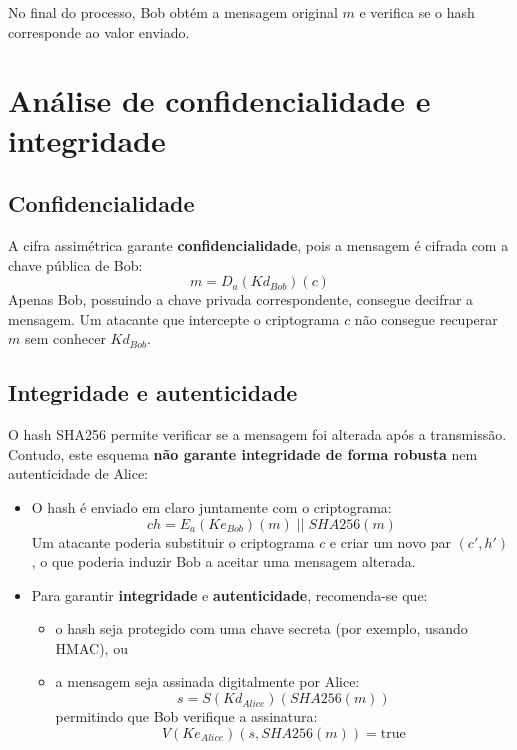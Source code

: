 No final do processo, Bob obtém a mensagem original $m$ e verifica se o hash corresponde ao valor enviado.

\section{Análise de confidencialidade e integridade}

\subsection*{Confidencialidade}

A cifra assimétrica garante \textbf{confidencialidade}, pois a mensagem é cifrada com a chave pública de Bob:
\[
m = D_a(Kd_{Bob})(c)
\]
Apenas Bob, possuindo a chave privada correspondente, consegue decifrar a mensagem. Um atacante que intercepte o criptograma \(c\) não consegue recuperar \(m\) sem conhecer \(Kd_{Bob}\).

\subsection*{Integridade e autenticidade}

O hash SHA256 permite verificar se a mensagem foi alterada após a transmissão. Contudo, este esquema \textbf{não garante integridade de forma robusta} nem autenticidade de Alice:

\begin{itemize}
  \item O hash é enviado em claro juntamente com o criptograma:
  \[
  ch = E_a(Ke_{Bob})(m) \;||\; SHA256(m)
  \]
  Um atacante poderia substituir o criptograma \(c\) e criar um novo par \((c', h')\), o que poderia induzir Bob a aceitar uma mensagem alterada.
  
  \item Para garantir \textbf{integridade} e \textbf{autenticidade}, recomenda-se que:
  \begin{itemize}
    \item o hash seja protegido com uma chave secreta (por exemplo, usando HMAC), ou
    \item a mensagem seja assinada digitalmente por Alice:
    \[
    s = S(Kd_{Alice})(SHA256(m))
    \]
    permitindo que Bob verifique a assinatura:
    \[
    V(Ke_{Alice})(s, SHA256(m)) = \text{true}
    \]
  \end{itemize}
\end{itemize}